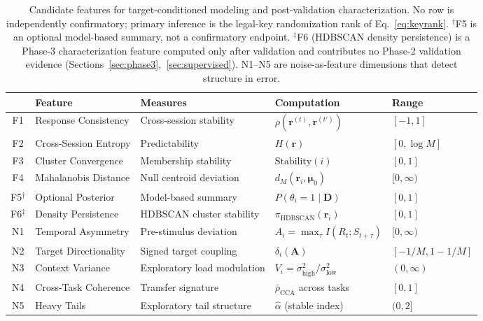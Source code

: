 \documentclass[11pt,letterpaper]{article}
\begin{document}
\begin{table}[h]
\centering
\caption{Candidate features for target-conditioned modeling and post-validation characterization. No row is independently confirmatory; primary inference is the legal-key randomization rank of Eq.~\ref{eq:keyrank}. $^{\dagger}$F5 is an optional model-based summary, not a confirmatory endpoint. $^{\ddagger}$F6 (HDBSCAN density persistence) is a Phase-3 characterization feature computed only after validation and contributes no Phase-2 validation evidence (Sections~\ref{sec:phase3},~\ref{sec:supervised}). N1--N5 are noise-as-feature dimensions that detect structure in error.}
\label{tab:features}
\begin{tabular}{@{}cllll@{}}
\toprule
& \textbf{Feature} & \textbf{Measures} & \textbf{Computation} & \textbf{Range} \\
\midrule
F1 & Response Consistency & Cross-session stability & $\rho(\mathbf{r}^{(t)}, \mathbf{r}^{(t')})$ & $[-1, 1]$ \\
F2 & Cross-Session Entropy & Predictability & $H(\mathbf{r})$ & $[0, \log M]$ \\
F3 & Cluster Convergence & Membership stability & $\text{Stability}(i)$ & $[0, 1]$ \\
F4 & Mahalanobis Distance & Null centroid deviation & $d_M(\mathbf{r}_i, \boldsymbol{\mu}_0)$ & $[0, \infty)$ \\
F5$^{\dagger}$ & Optional Posterior & Model-based summary & $P(\theta_i = 1 \mid \mathbf{D})$ & $[0, 1]$ \\
F6$^{\ddagger}$ & Density Persistence & HDBSCAN cluster stability & $\pi_{\text{HDBSCAN}}(\mathbf{r}_i)$ & $[0, 1]$ \\
\midrule
N1 & Temporal Asymmetry & Pre-stimulus deviation & $A_i = \max_\tau I(R_t; S_{t+\tau})$ & $[0, \infty)$ \\
N2 & Target Directionality & Signed target coupling & $\delta_i(\mathbf{A})$ & $[-1/M, 1-1/M]$ \\
N3 & Context Variance & Exploratory load modulation & $V_i = \sigma^2_{\text{high}} / \sigma^2_{\text{low}}$ & $(0, \infty)$ \\
N4 & Cross-Task Coherence & Transfer signature & $\bar{\rho}_{\text{CCA}}$ across tasks & $[0, 1]$ \\
N5 & Heavy Tails & Exploratory tail structure & $\hat{\alpha}$ (stable index) & $(0, 2]$ \\
\bottomrule
\end{tabular}
\end{table}
\end{document}
